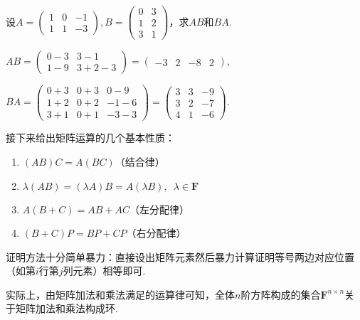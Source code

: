 \begin{example}{}{}
    设$A=\begin{pmatrix}
            1 & 0 & -1 \\
            1 & 1 & -3
        \end{pmatrix}, B=\begin{pmatrix}
            0 & 3 \\
            1 & 2 \\
            3 & 1
        \end{pmatrix}$，求$AB$和$BA$.
\end{example}

\begin{solution}
    $AB =\begin{pmatrix}
            0-3 & 3-1   \\
            1-9 & 3+2-3
        \end{pmatrix}=\begin{pmatrix}
            -3 & 2 & -8 & 2
        \end{pmatrix}$,

    $BA=\begin{pmatrix}
            0+3 & 0+3 & 0-9  \\
            1+2 & 0+2 & -1-6 \\
            3+1 & 0+1 & -3-3
        \end{pmatrix}=\begin{pmatrix}
            3 & 3 & -9 \\
            3 & 2 & -7 \\
            4 & 1 & -6
        \end{pmatrix}$.
\end{solution}

接下来给出矩阵运算的几个基本性质：
\begin{enumerate}
    \item $(AB)C=A(BC)$（结合律）

    \item $\lambda(AB)=(\lambda A)B=A(\lambda B),\enspace \lambda \in \mathbf{F}$

    \item $A(B+C)=AB+AC$（左分配律）

    \item $(B+C)P=BP+CP$（右分配律）
\end{enumerate}
证明方法十分简单暴力：直接设出矩阵元素然后暴力计算证明等号两边对应位置（如第$i$行第$j$列元素）相等即可.

实际上，由矩阵加法和乘法满足的运算律可知，全体$n$阶方阵构成的集合$\mathbf{F}^{n\times n}$关于矩阵加法和乘法构成环.


